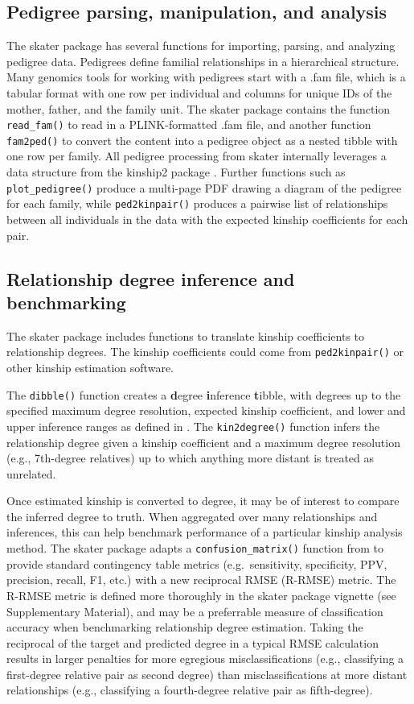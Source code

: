 \documentclass{bioinfo}
\begin{document}
\subsection{Pedigree parsing, manipulation, and analysis}

The skater package has several functions for importing, parsing, and
analyzing pedigree data. Pedigrees define familial relationships in a
hierarchical structure. Many genomics tools for working with pedigrees
start with a .fam file, which is a tabular format with one row per
individual and columns for unique IDs of the mother, father, and the
family unit. The skater package contains the function
\texttt{read\_fam()} to read in a PLINK-formatted .fam file, and another
function \texttt{fam2ped()} to convert the content into a pedigree
object as a nested tibble with one row per family. All pedigree
processing from skater internally leverages a data structure from the
kinship2 package \citep{kinship2}. Further functions such as
\texttt{plot\_pedigree()} produce a multi-page PDF drawing a diagram of
the pedigree for each family, while \texttt{ped2kinpair()} produces a
pairwise list of relationships between all individuals in the data with
the expected kinship coefficients for each pair.

\subsection{Relationship degree inference and benchmarking}

The skater package includes functions to translate kinship coefficients
to relationship degrees. The kinship coefficients could come from
\texttt{ped2kinpair()} or other kinship estimation software.

The \texttt{dibble()} function creates a \textbf{d}egree
\textbf{i}nference \textbf{t}ibble, with degrees up to the specified
maximum degree resolution, expected kinship coefficient, and lower and
upper inference ranges as defined in \citet{manichaikul2010}. The
\texttt{kin2degree()} function infers the relationship degree given a
kinship coefficient and a maximum degree resolution (e.g., 7th-degree
relatives) up to which anything more distant is treated as unrelated.

Once estimated kinship is converted to degree, it may be of interest to
compare the inferred degree to truth. When aggregated over many
relationships and inferences, this can help benchmark performance of a
particular kinship analysis method. The skater package adapts a
\texttt{confusion\_matrix()} function from \citet{clark2021} to provide
standard contingency table metrics (e.g.~sensitivity, specificity, PPV,
precision, recall, F1, etc.) with a new reciprocal RMSE (R-RMSE) metric.
The R-RMSE metric is defined more thoroughly in the skater package
vignette (see Supplementary Material), and may be a preferrable measure
of classification accuracy when benchmarking relationship degree
estimation. Taking the reciprocal of the target and predicted degree in
a typical RMSE calculation results in larger penalties for more
egregious misclassifications (e.g., classifying a first-degree relative
pair as second degree) than misclassifications at more distant
relationships (e.g., classifying a fourth-degree relative pair as
fifth-degree).
\end{document}
